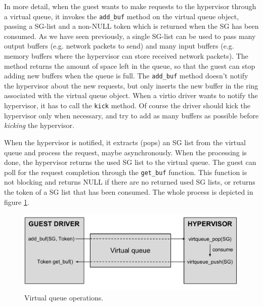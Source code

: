\vspace{0.5cm}

In more detail, when the guest wants to make requests to the hypervisor through a virtual queue, it invokes the \texttt{add\_buf} method
on the virtual queue object, passing a SG-list and a non-NULL token which is returned when the SG has been consumed. As we have seen 
previously, a single SG-list can be used to pass many output buffers (e.g. network packets to send) and many input buffers (e.g. memory 
buffers where the hypervisor can store received network packets). The method returns the amount of space left in the queue, so that 
the guest can stop adding new buffers when the queue is full.
The \texttt{add\_buf} method doesn't notify the hypervisor about the new requests, but only inserts the new buffer in the ring associated
with the virtual queue object. When a virtio driver wants to notify the hypervisor, it has to call the \texttt{kick} method. Of course
the driver should kick the hypervisor only when necessary, and try to add as many buffers as possible before \emph{kicking} the hypervisor.

When the hypervisor is notified, it extracts (pops) an SG list from the virtual queue and process the request, maybe asynchronously.
When the processing is done, the hypervisor returns the used SG list to the virtual queue.
The guest can poll for the request completion through the \texttt{get\_buf} function. This function is not blocking and returns NULL if 
there are no returned used SG lists, or returns the token of a SG list that has been consumed.
The whole process is depicted in figure \ref{fig:virtqueue}.

\begin{figure}[bt]
\centering
\includegraphics[scale = 0.48]{virtqueue.pdf}
\caption{Virtual queue operations.}
\label{fig:virtqueue}
\end{figure}

\vspace{0.5cm}

